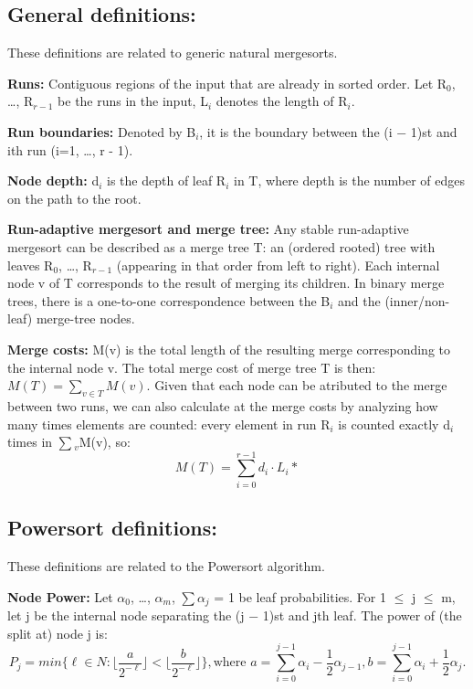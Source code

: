 \documentclass{article}
\begin{document}
\subsection{General definitions:}
These definitions are related to generic natural mergesorts. 

\textbf{Runs:} Contiguous regions of the input that are already in sorted order. 
Let R$_0$, \dots , R$_{r-1}$ be the runs in the input, L$_i$ denotes the length of R$_i$.\cite{https://doi.org/10.4230/lipics.esa.2018.63}

\textbf{Run boundaries:} Denoted by B$_i$, it is the boundary between the (i − 1)st and ith run (i=1, \dots, r - 1).\cite{Gelling_2023}

\textbf{Node depth:} d$_i$ is the depth of leaf R$_i$ in T, where depth is the number of edges on the path to the root.\cite{Gelling_2023}

\textbf{Run-adaptive mergesort and merge tree:} Any stable run-adaptive mergesort can be described as a merge tree T: 
an (ordered rooted) tree with leaves R$_0$, \dots, R$_{r-1}$ (appearing in that order from left to right). 
Each internal node v of T corresponds to the result of merging its children. 
In binary merge trees, there is a one-to-one correspondence between the B$_i$ and the (inner/non-leaf) merge-tree nodes.
\cite{Gelling_2023}\cite{https://doi.org/10.4230/lipics.esa.2018.63}

\textbf{Merge costs:} M(v) is the total length of the resulting merge corresponding to the internal node v.
The total merge cost of merge tree T is then: $M(T) = \sum_{v \in T}M(v)$. 
Given that each node can be atributed to the merge between two runs, we can also calculate
at the merge costs by analyzing how many times elements are counted:
every element in run R$_i$ is counted exactly d$_i$ times in $\sum$$_v$M(v), so: 
\begin{equation}
        M(T) = \sum^{r-1}_{i=0}d_i \cdot L_i*    
\end{equation}
\cite{Gelling_2023}\cite{https://doi.org/10.4230/lipics.esa.2018.63}
\subsection{Powersort definitions:}
These definitions are related to the Powersort algorithm.

\textbf{Node Power:} Let $\alpha$$_0$, \dots, $\alpha$$_m$, $\sum$$\alpha$$_j$ = 1 be leaf probabilities. 
For 1 $\le$ j $\le$ m, let j be the internal node separating the (j − 1)st and jth leaf. The power of (the split at) node j is:
\begin{equation}
    P_j = min\{ \ell \in N: \lfloor{\frac{a}{2^{-\ell}}}\rfloor   < \lfloor{\frac{b}{2^{-\ell}}}\rfloor \}, \text{where } a = \sum_{i=0}^{j-1} \alpha_i - \frac{1}{2}\alpha_{j-1}, b = \sum_{i=0}^{j-1} \alpha_i + \frac{1}{2}\alpha_j.
\end{equation}
\end{document}
